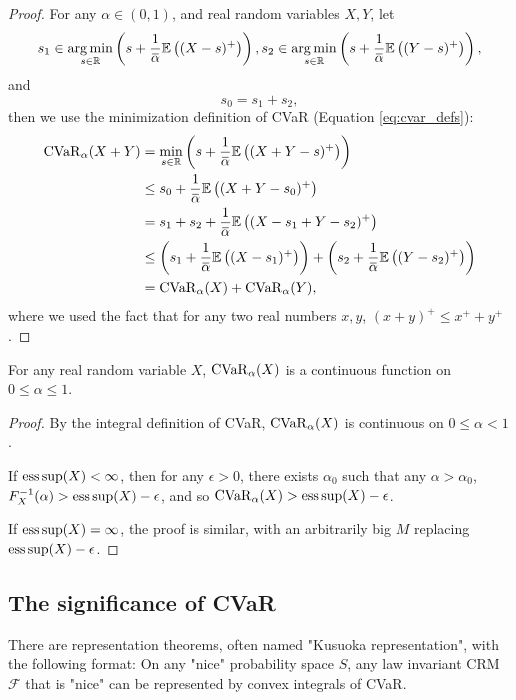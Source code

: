 \begin{proof}
	For any $\alpha \in (0, 1)$, and real random variables $X, Y$, let 
	$$s_1 \in \argmin_{s\in\mathbb{R}} \left(s+\frac{1}{{\overbar{\alpha}}} \mathbb{E}\left((X-s)^{+}\right)\right),
	s_2 \in \argmin_{s\in\mathbb{R}} \left(s+\frac{1}{{\overbar{\alpha}}} \mathbb{E}\left((Y-s)^{+}\right)\right),$$
	and 
	$$s_0 = s_1 + s_2,$$  
	then we use the minimization definition of CVaR (Equation \ref{eq:cvar_defs}):
	\begin{align*}
	\cvar_\alpha( X+ Y) &= 
		\min_{ s \in\mathbb{R}}
		\left( s+\frac{1}{{\overbar{\alpha}}} \mathbb{E}\left((X + Y-s)^{+}\right)\right)\\
		&\le s_0 + \frac{1}{{\overbar{\alpha}}} \mathbb{E}\left((X + Y-s_0)^{+}\right)\\
		&= s_1+s_2 + \frac{1}{{\overbar{\alpha}}} \mathbb{E}\left((X - s_1 + Y-s_2)^{+}\right)\\
	  &\le  \left(s_1+\frac{1}{{\overbar{\alpha}}} \mathbb{E}\left((X-s_1)^{+}\right)\right)
	  +  \left(s_2+\frac{1}{{\overbar{\alpha}}} \mathbb{E}\left((Y-s_2)^{+}\right)\right)\\
	  &=  \cvar_\alpha( X) +  \cvar_\alpha(Y),
	\end{align*}
	where we used the fact that for any two real numbers $x,y$, $(x+y)^+ \le x^+ + y^+$.
\end{proof}

\begin{prop}
For any real random variable $X$, $\operatorname{CVaR}_\alpha(X)$ is a continuous function on $0 \le \alpha\le 1$.
\end{prop}
\begin{proof}
By the integral definition of CVaR, $\operatorname{CVaR}_\alpha(X)$ is continuous on $0 \le \alpha < 1$.

If $\operatorname*{ess\,sup}(X) < \infty$, then for any $\epsilon> 0$, there exists $\alpha_0$ such that any $\alpha > \alpha_0$, $F_X^{-1}(\alpha) >\operatorname*{ess\,sup}(X) -\epsilon $, and so $\operatorname{CVaR}_{\alpha}(X) > \operatorname*{ess\,sup}(X) -\epsilon$.

If $\operatorname*{ess\,sup}(X) = \infty$, the proof is similar, with an arbitrarily big $M$ replacing $\operatorname*{ess\,sup}(X) -\epsilon$.
\end{proof}

\subsection{The significance of CVaR}
There are representation theorems, often named "Kusuoka representation", with the following format: On any "nice" probability space $S$, any law invariant CRM $\mathcal{F}$ that is "nice" can be represented by  convex integrals of CVaR. 


